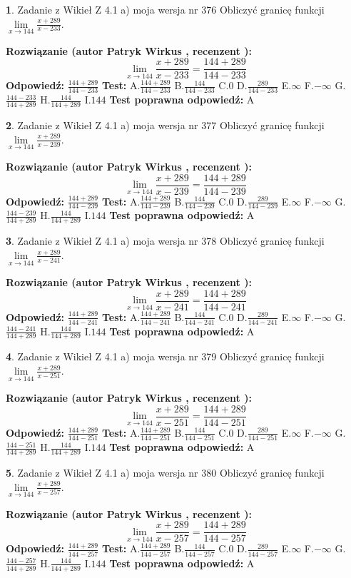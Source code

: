 \documentclass[12pt, a4paper]{article}
\theoremstyle{definition} %
\newtheorem{zad}{}
\newcommand{\zadStart}[1]{\begin{zad}#1\newline}
\newcommand{\zadStop}{\end{zad}}
\newcommand{\rozwStart}[2]{\noindent \textbf{Rozwiązanie (autor #1 , recenzent #2): }\newline}
\newcommand{\rozwStop}{\newline}
\newcommand{\odpStart}{\noindent \textbf{Odpowiedź:}\newline}
\newcommand{\odpStop}{\newline}
\newcommand{\testStart}{\noindent \textbf{Test:}\newline}
\newcommand{\testStop}{\newline}
\newcommand{\kluczStart}{\noindent \textbf{Test poprawna odpowiedź:}\newline}
\newcommand{\kluczStop}{\newline}
\begin{document}
\zadStart{Zadanie z Wikieł Z 4.1 a) moja wersja nr 376}
Obliczyć granicę funkcji $\lim\limits_{x\to144}\frac{x+289}{x-233}$.
\zadStop
\rozwStart{Patryk Wirkus}{}
$$\lim\limits_{x\to144}\frac{x+289}{x-233} = \frac{144+289}{144-233}$$
\rozwStop
\odpStart
$\frac{144+289}{144-233}$
\odpStop
\testStart
A.$\frac{144+289}{144-233}$
B.$\frac{144}{144-233}$
C.$0$
D.$\frac{289}{144-233}$
E.$\infty$
F.$-\infty$
G.$\frac{144-233}{144+289}$
H.$\frac{144}{144+289}$
I.$144$
\testStop
\kluczStart
A
\kluczStop



\zadStart{Zadanie z Wikieł Z 4.1 a) moja wersja nr 377}
Obliczyć granicę funkcji $\lim\limits_{x\to144}\frac{x+289}{x-239}$.
\zadStop
\rozwStart{Patryk Wirkus}{}
$$\lim\limits_{x\to144}\frac{x+289}{x-239} = \frac{144+289}{144-239}$$
\rozwStop
\odpStart
$\frac{144+289}{144-239}$
\odpStop
\testStart
A.$\frac{144+289}{144-239}$
B.$\frac{144}{144-239}$
C.$0$
D.$\frac{289}{144-239}$
E.$\infty$
F.$-\infty$
G.$\frac{144-239}{144+289}$
H.$\frac{144}{144+289}$
I.$144$
\testStop
\kluczStart
A
\kluczStop



\zadStart{Zadanie z Wikieł Z 4.1 a) moja wersja nr 378}
Obliczyć granicę funkcji $\lim\limits_{x\to144}\frac{x+289}{x-241}$.
\zadStop
\rozwStart{Patryk Wirkus}{}
$$\lim\limits_{x\to144}\frac{x+289}{x-241} = \frac{144+289}{144-241}$$
\rozwStop
\odpStart
$\frac{144+289}{144-241}$
\odpStop
\testStart
A.$\frac{144+289}{144-241}$
B.$\frac{144}{144-241}$
C.$0$
D.$\frac{289}{144-241}$
E.$\infty$
F.$-\infty$
G.$\frac{144-241}{144+289}$
H.$\frac{144}{144+289}$
I.$144$
\testStop
\kluczStart
A
\kluczStop



\zadStart{Zadanie z Wikieł Z 4.1 a) moja wersja nr 379}
Obliczyć granicę funkcji $\lim\limits_{x\to144}\frac{x+289}{x-251}$.
\zadStop
\rozwStart{Patryk Wirkus}{}
$$\lim\limits_{x\to144}\frac{x+289}{x-251} = \frac{144+289}{144-251}$$
\rozwStop
\odpStart
$\frac{144+289}{144-251}$
\odpStop
\testStart
A.$\frac{144+289}{144-251}$
B.$\frac{144}{144-251}$
C.$0$
D.$\frac{289}{144-251}$
E.$\infty$
F.$-\infty$
G.$\frac{144-251}{144+289}$
H.$\frac{144}{144+289}$
I.$144$
\testStop
\kluczStart
A
\kluczStop



\zadStart{Zadanie z Wikieł Z 4.1 a) moja wersja nr 380}
Obliczyć granicę funkcji $\lim\limits_{x\to144}\frac{x+289}{x-257}$.
\zadStop
\rozwStart{Patryk Wirkus}{}
$$\lim\limits_{x\to144}\frac{x+289}{x-257} = \frac{144+289}{144-257}$$
\rozwStop
\odpStart
$\frac{144+289}{144-257}$
\odpStop
\testStart
A.$\frac{144+289}{144-257}$
B.$\frac{144}{144-257}$
C.$0$
D.$\frac{289}{144-257}$
E.$\infty$
F.$-\infty$
G.$\frac{144-257}{144+289}$
H.$\frac{144}{144+289}$
I.$144$
\testStop
\kluczStart
A
\kluczStop
\end{document}
